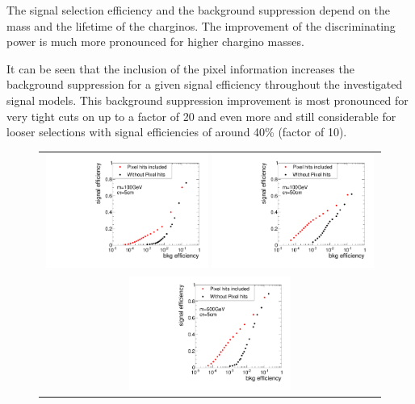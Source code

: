 The signal selection efficiency and the background suppression depend on the mass and the lifetime of the charginos.
The improvement of the discriminating power is much more pronounced for higher chargino masses.

It can be seen that the inclusion of the pixel information increases the background suppression for a given signal efficiency throughout the investigated signal models.
This background suppression improvement is most pronounced for very tight cuts on \ias up to a factor of 20 and even more and still considerable for looser selections with signal efficiencies of around 40\% (factor of 10).

\begin{figure}[!b]
  \centering 
  \begin{tabular}{c}
    \includegraphics[width=0.49\textwidth]{figures/analysis/rocplot_wjets_mass_100GeV_ctau_5cm.pdf} 
    \includegraphics[width=0.49\textwidth]{figures/analysis/rocplot_wjets_mass_100GeV_ctau_50cm.pdf} \\
    \includegraphics[width=0.49\textwidth]{figures/analysis/rocplot_wjets_mass_500GeV_ctau_5cm.pdf} 

\end{tabular}
\end{figure}
